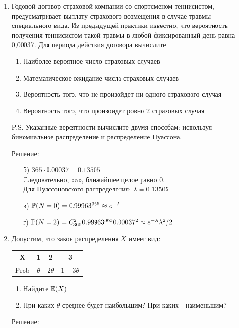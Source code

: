 \documentclass[12pt, a4paper]{article}\usepackage[]{graphicx}\usepackage[]{color}
\begin{document}
\begin{enumerate}
\item Годовой договор страховой компании со спортсменом-теннисистом, предусматривает выплату страхового возмещения  в случае травмы специального вида. Из предыдущей практики известно, что вероятность получения теннисистом такой травмы  в любой фиксированный день равна 0,00037. Для периода действия договора вычислите
\begin{enumerate}
\item Наиболее вероятное число страховых случаев
\item Математическое ожидание числа страховых случаев
\item Вероятность того, что не произойдет ни одного страхового случая
\item Вероятность того, что произойдет ровно 2 страховых случая
\end{enumerate}
P.S. Указанные вероятности вычислите двумя способам: используя биномиальное распределение и распределение Пуассона.

Решение:
\begin{enumerate}
\item[б)] $365\cdot 0.00037=0.13505$ \\
Следовательно, «a», ближайшее целое равно 0. \\
Для Пуассоновского распределения: $\lambda=0.13505$
\item[в)] $\P(N=0)=0.99963^{365}\approx e^{-\lambda}$
\item[г)] $\P(N=2)=C_{365}^{2}0.99963^{363}0.00037^{2}\approx e^{-\lambda}\lambda^{2}/2$
\end{enumerate}

\item Допустим, что закон распределения $X$ имеет вид:
\begin{tabular}{c|ccc}
  X & 1 & 2 & 3 \\
  \hline
  Prob & $\theta$ & $2\theta$ & $1-3\theta$ \\
\end{tabular}
\begin{enumerate}
\item Найдите $\E(X)$ %
\item При каких $\theta$ среднее будет наибольшим? При каких - наименьшим?
\end{enumerate}

Решение:


\end{enumerate}
\end{document}
